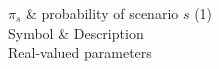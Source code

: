 {  %
  $\pi_s$ & probability of scenario $s$ (1) \\
} {
  Symbol & Description \\
} {
  Real-valued parameters
} {
  \label{tbl:params}
}


